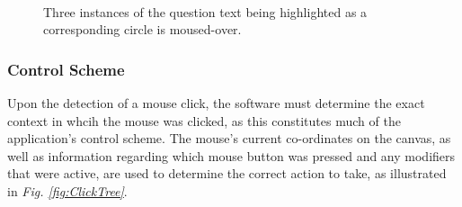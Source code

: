 \documentclass[12pt,twoside,notitlepage,xetex]{report}
\begin{document}
\begin{center}
\begin{figure}[H]
\begin{center}
\\
\vspace{0.5cm}
\end{center}
\caption{Three instances of the question text being highlighted as a corresponding circle is moused-over.}
\label{fig:Highlighting}
\end{figure}
\end{center}

\subsubsection{Control Scheme}

Upon the detection of a mouse click, the software must determine the exact context in whcih the mouse was clicked, as this constitutes much of the application's control scheme.  The mouse's current co-ordinates on the canvas, as well as information regarding which mouse button was pressed and any modifiers that were active, are used to determine the correct action to take, as illustrated in \emph{Fig. \ref{fig:ClickTree}}.
\end{document}
